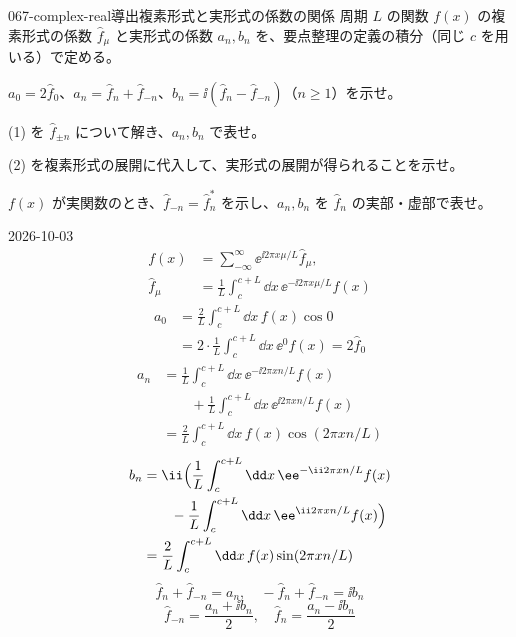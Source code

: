 \documentclass[uplatex,dvipdfmx,a4paper,11pt]{jsarticle}
\begin{document}
\mondaihen
{}
\begin{mondai}{067-complex-real}{導出}{複素形式と実形式の係数の関係}
周期 $L$ の関数 $f(x)$ の複素形式の係数 $\hat{f}_{\mu}$ と実形式の係数 $a_n,b_n$ を、要点整理の定義の積分（同じ $c$ を用いる）で定める。
\begin{shoumon}
  \item $a_0=2\hat{f}_0$、$a_n=\hat{f}_n+\hat{f}_{-n}$、$b_n=\ii(\hat{f}_n-\hat{f}_{-n})$（$n\ge1$）を示せ。
  \item (1) を $\hat{f}_{\pm n}$ について解き、$a_n,b_n$ で表せ。
  \item (2) を複素形式の展開に代入して、実形式の展開が得られることを示せ。
  \item $f(x)$ が実関数のとき、$\hat{f}_{-n}=\hat{f}_n^{*}$ を示し、$a_n,b_n$ を $\hat{f}_n$ の実部・虚部で表せ。
\end{shoumon}
\begin{kotaeutsushi}{2026-10-03}
\begin{align*}
  f(x)&=\sum_{-\infty}^{\infty}\ee^{\ii2\pi x\mu/L}\hat{f}_{\mu},\\
  \hat{f}_{\mu}&=\frac{1}{L}\int_{c}^{c+L}\dd x\,\ee^{-\ii2\pi x\mu/L}f(x)
\end{align*}
\begin{align*}
  a_0&=\frac{2}{L}\int_{c}^{c+L}\dd x\,f(x)\cos0\\
  &=2\cdot\frac{1}{L}\int_{c}^{c+L}\dd x\,\ee^{0}f(x)=2\hat{f}_0
\end{align*}
\begin{align*}
  a_n&=\frac{1}{L}\int_{c}^{c+L}\dd x\,\ee^{-\ii2\pi xn/L}f(x)\\
  &\qquad+\frac{1}{L}\int_{c}^{c+L}\dd x\,\ee^{\ii2\pi xn/L}f(x)\\
  &=\frac{2}{L}\int_{c}^{c+L}\dd x\,f(x)\cos(2\pi xn/L)
\end{align*}
\begin{align*}
  b_n&=\ii\Bigl(\frac{1}{L}\int_{c}^{c+L}\dd x\,\ee^{-\ii2\pi xn/L}f(x)\\
  &\qquad-\frac{1}{L}\int_{c}^{c+L}\dd x\,\ee^{\ii2\pi xn/L}f(x)\Bigr)\\
  &=\frac{2}{L}\int_{c}^{c+L}\dd x\,f(x)\sin(2\pi xn/L)
\end{align*}
\[ \hat{f}_n+\hat{f}_{-n}=a_n,\quad -\hat{f}_n+\hat{f}_{-n}=\ii b_n \]
\[ \hat{f}_{-n}=\frac{a_n+\ii b_n}{2},\quad \hat{f}_n=\frac{a_n-\ii b_n}{2} \]
\begin{align*}

\end{align*}
\end{kotaeutsushi}
\end{mondai}
\end{document}
